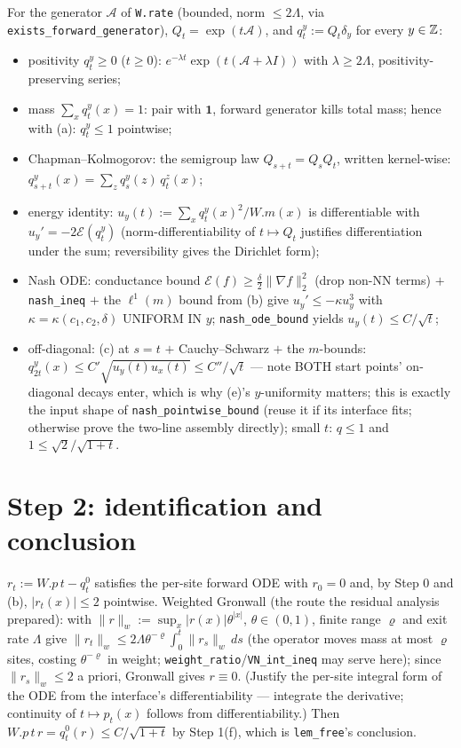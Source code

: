 \documentclass[11pt]{article}
\theoremstyle{plain}
\theoremstyle{remark}
\newcommand{\ee}{\mathcal E}
\begin{document}
For the generator $\mathcal A$ of \texttt{W.rate} (bounded, norm $\le2\Lambda$,
via \texttt{exists\_forward\_generator}), $Q_t=\exp(t\mathcal A)$, and
$q^y_t:=Q_t\delta_y$ for every $y\in\mathbb{Z}$:
\begin{itemize}
\item[(a)] positivity $q^y_t\ge0$ ($t\ge0$): $e^{-\lambda t}\exp(t(\mathcal
A+\lambda I))$ with $\lambda\ge2\Lambda$, positivity-preserving series;
\item[(b)] mass $\sum_xq^y_t(x)=1$: pair with $\mathbf1$, forward generator
kills total mass; hence with (a): $q^y_t\le1$ pointwise;
\item[(c)] Chapman--Kolmogorov: the semigroup law $Q_{s+t}=Q_sQ_t$, written
kernel-wise: $q^y_{s+t}(x)=\sum_zq^y_s(z)\,q^z_t(x)$;
\item[(d)] energy identity: $u_y(t):=\sum_xq^y_t(x)^2/W.m(x)$ is
differentiable with $u_y'=-2\ee(q^y_t)$ (norm-differentiability of
$t\mapsto Q_t$ justifies differentiation under the sum; reversibility gives
the Dirichlet form);
\item[(e)] Nash ODE: conductance bound $\ee(f)\ge\tfrac\delta2\|\nabla
f\|_2^2$ (drop non-NN terms) $+$ \texttt{nash\_ineq} $+$ the $\ell^1(m)$ bound
from (b) give $u_y'\le-\kappa u_y^3$ with $\kappa=\kappa(c_1,c_2,\delta)$
UNIFORM IN $y$; \texttt{nash\_ode\_bound} yields $u_y(t)\le C/\sqrt t$;
\item[(f)] off-diagonal: (c) at $s=t$ $+$ Cauchy--Schwarz $+$ the $m$-bounds:
$q^y_{2t}(x)\le C'\sqrt{u_y(t)u_x(t)}\le C''/\sqrt t$ --- note BOTH start
points' on-diagonal decays enter, which is why (e)'s $y$-uniformity matters;
this is exactly the input shape of \texttt{nash\_pointwise\_bound} (reuse it
if its interface fits; otherwise prove the two-line assembly directly);
small $t$: $q\le1$ and $1\le\sqrt2/\sqrt{1+t}$.
\end{itemize}

\section*{Step 2: identification and conclusion}

$r_t:=W.p\,t-q^0_t$ satisfies the per-site forward ODE with $r_0=0$ and, by
Step 0 and (b), $|r_t(x)|\le2$ pointwise. Weighted Gronwall (the route the
residual analysis prepared): with $\|r\|_w:=\sup_x|r(x)|\theta^{|x|}$,
$\theta\in(0,1)$, finite range $\varrho$ and exit rate $\Lambda$ give
$\|r_t\|_w\le2\Lambda\theta^{-\varrho}\int_0^t\|r_s\|_w\,ds$ (the operator
moves mass at most $\varrho$ sites, costing $\theta^{-\varrho}$ in weight;
\texttt{weight\_ratio}/\texttt{VN\_int\_ineq} may serve here); since
$\|r_s\|_w\le2$ a priori, Gronwall gives $r\equiv0$. (Justify the per-site
integral form of the ODE from the interface's differentiability --- integrate
the derivative; continuity of $t\mapsto p_t(x)$ follows from
differentiability.) Then $W.p\,t\,r=q^0_t(r)\le C/\sqrt{1+t}$ by Step 1(f),
which is \texttt{lem\_free}'s conclusion.
\end{document}
